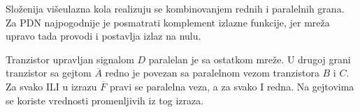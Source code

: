 Složenija višeulazna kola realizuju se kombinovanjem rednih i paralelnih grana. Za PDN najpogodnije je posmatrati komplement izlazne funkcije, jer mreža upravo tada provodi i postavlja izlaz na nulu.

Tranzistor upravljan signalom $D$ paralelan je sa ostatkom mreže. U drugoj grani tranzistor sa gejtom $\overline A$ redno je povezan sa paralelnom vezom tranzistora $B$ i $C$. Za svako ILI u izrazu $\overline F$ pravi se paralelna veza, a za svako I redna. Na gejtovima se koriste vrednosti promenljivih iz tog izraza.
